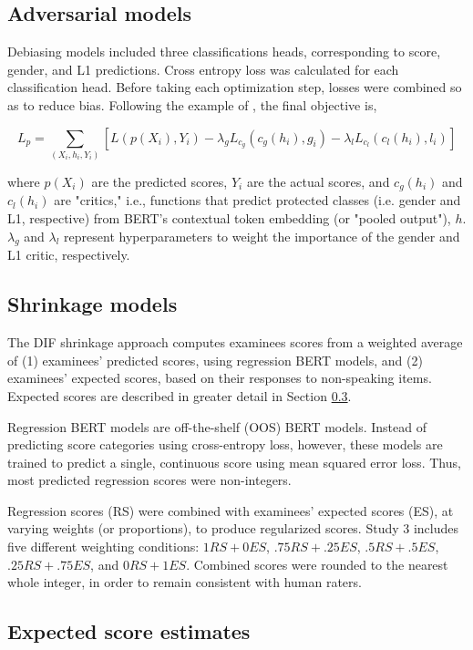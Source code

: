 \documentclass [PhD] {uclathes}
\begin{document}
\subsection{Adversarial models}

Debiasing models included three classifications heads, corresponding to score, gender, and L1 predictions. Cross entropy loss was calculated for each classification head. Before taking each optimization step, losses were combined so as to reduce bias. Following the example of \citet{wang2019balanced}, the final objective is, 

$$
L_p = \sum_{(X_i, h_i, Y_i)} [L(p(X_i), Y_i) - \lambda_g L_{c_g}(c_g(h_i), g_i) - \lambda_l L_{c_l}(c_l(h_i), l_i)] 
$$

where $p(X_i)$ are the predicted scores, $Y_i$ are the actual scores, and $c_g(h_i)$ and $c_l(h_i)$ are "critics," i.e., functions that predict protected classes (i.e. gender and L1, respective) from BERT’s contextual token embedding (or "pooled output"), $h$. $\lambda_g$ and $\lambda_l$ represent hyperparameters to weight the importance of the gender and L1 critic, respectively. 

\subsection{Shrinkage models}

The DIF shrinkage approach computes examinees scores from a weighted average of (1) examinees’ predicted scores, using regression BERT models, and (2) examinees' expected scores, based on their responses to non-speaking items. Expected scores are described in greater detail in Section \ref{sec:meth_es}. 

Regression BERT models are off-the-shelf (OOS) BERT models. Instead of predicting score categories using cross-entropy loss, however, these models are trained to predict a single, continuous score using mean squared error loss. Thus, most predicted regression scores were non-integers. 

Regression scores (RS) were combined with examinees’ expected scores (ES), at varying weights (or proportions), to produce regularized scores. Study 3 includes five different weighting conditions: $1 RS + 0 ES$, $.75 RS + .25 ES$, $.5 RS + .5 ES$, $.25 RS + .75 ES$, and $0 RS + 1 ES$. Combined scores were rounded to the nearest whole integer, in order to remain consistent with human raters. 

\subsection{Expected score estimates}
\label{sec:meth_es}
\end{document}
